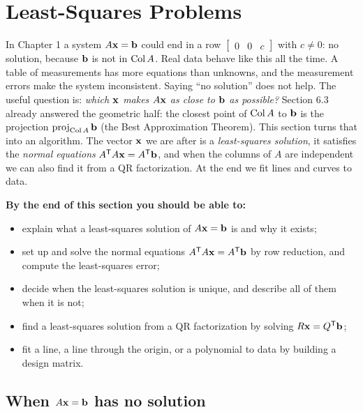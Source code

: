 \documentclass[11pt]{article}
\begin{document}
\section{Least-Squares Problems}

\begin{guide}
In Chapter 1 a system $A\mathbf{x}=\mathbf{b}$ could end in a row $\begin{bmatrix}0&0&c\end{bmatrix}$ with $c\neq0$: no solution, because $\mathbf{b}$ is not in $\operatorname{Col} A$. Real data behave like this all the time. A table of measurements has more equations than unknowns, and the measurement errors make the system inconsistent. Saying ``no solution'' does not help. The useful question is: \emph{which $\mathbf{x}$ makes $A\mathbf{x}$ as close to $\mathbf{b}$ as possible?} Section 6.3 already answered the geometric half: the closest point of $\operatorname{Col} A$ to $\mathbf{b}$ is the projection $\operatorname{proj}_{\operatorname{Col} A}\mathbf{b}$ (the Best Approximation Theorem). This section turns that into an algorithm. The vector $\mathbf{x}$ we are after is a \emph{least-squares solution}, it satisfies the \emph{normal equations} $A^{\mathsf T} A\mathbf{x}=A^{\mathsf T}\mathbf{b}$, and when the columns of $A$ are independent we can also find it from a QR factorization. At the end we fit lines and curves to data.
\end{guide}

\textbf{By the end of this section you should be able to:}
\begin{itemize}
  \item explain what a least-squares solution of $A\mathbf{x}=\mathbf{b}$ is and why it exists;
  \item set up and solve the normal equations $A^{\mathsf T} A\mathbf{x}=A^{\mathsf T}\mathbf{b}$ by row reduction, and compute the least-squares error;
  \item decide when the least-squares solution is unique, and describe all of them when it is not;
  \item find a least-squares solution from a QR factorization by solving $R\mathbf{x}=Q^{\mathsf T}\mathbf{b}$;
  \item fit a line, a line through the origin, or a polynomial to data by building a design matrix.
\end{itemize}

\subsection*{When $A\mathbf{x}=\mathbf{b}$ has no solution}
\end{document}
